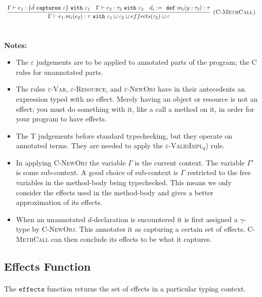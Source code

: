 \documentclass{llncs}
\newcommand{\keywadj}[1]{\mathtt{#1}}
\newcommand{\keyw}[1]{\keywadj{#1}~}
\begin{document}
\[
\begin{array}{c}
\infer[\textsc{(C-MethCall)}]
	{\Gamma \vdash e_1.m_i(e_2) : \tau~ \keyw{with} \varepsilon_1 \cup \varepsilon_2 \cup effects(\tau_2) \cup \varepsilon}
	{\Gamma \vdash e_1 : \{ \bar d~\keyw{captures} \varepsilon \}~\keyw{with} \varepsilon_1 & \Gamma \vdash e_2:\tau_2~\keyw{with} \varepsilon_2&d_i :=~\keyw{def} m_i(y:\tau_2):\tau } \\[5ex]
\end{array}
\]


\noindent \textbf{Notes:}

\begin{itemize}
	\item The \textsc{$\varepsilon$} judgements are to be applied to annotated parts of the program; the \textsc{C} rules for unannotated parts. 
	\item The rules \textsc{$\varepsilon$-Var}, \textsc{$\varepsilon$-Resource}, and \textsc{$\varepsilon$-NewObj} have in their antecedents an expression typed with no effect. Merely having an object or resource is not an effect; you must do something with it, like a call a method on it, in order for your program to have effects.
	\item The \textsc{T} judgements before standard typechecking, but they operate on annotated terms. They are needed to apply the \textsc{$\varepsilon$-ValidImpl$_d$)} rule.
	\item In applying \textsc{C-NewObj} the variable $\Gamma$ is the current context. The variable $\Gamma'$ is some sub-context. A good choice of sub-context is $\Gamma$ restricted to the free variables in the method-body being typechecked. This means we only consider the effects used in the method-body and gives a better approximation of its effects.
	\item When an unannotated $d$-declaration is encountered it is first assigned a $\gamma$-type by \textsc{C-NewObj}. This annotates it as capturing a certain set of effects. \textsc{C-MethCall} can then conclude its effects to be what it captures.
\end{itemize}

\subsection{Effects Function}

\paragraph{}
The $\keywadj{effects}$ function returns the set of effects in a particular typing context.
\end{document}

